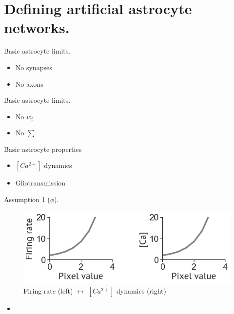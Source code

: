 \documentclass[10pt]{beamer}
\begin{document}
\section[AANs]{Defining artificial astrocyte networks.}

\begin{frame}[fragile]{Basic astrocyte limits.}
\begin{itemize}
    \item No synapses
    \item No axons 
\end{itemize}
\end{frame}

\begin{frame}[fragile]{Basic astrocyte limits.}
\begin{itemize}
    \item No $w_i$
    \item No $\sum$
\end{itemize}
\end{frame}

\begin{frame}[fragile]{Basic astrocyte properties}
\begin{itemize}
    \item $[Ca^{2+}]$ dynamics
    \item Gliotransmission
\end{itemize}
\end{frame}

\begin{frame}[fragile]{Assumption 1 ($\phi$).}
\begin{figure}
    \centering
    \includegraphics[scale=0.4]{images/phi_ca.png}
    \caption{Firing rate (left) $\leftrightarrow$ $[Ca^{2+}]$ dynamics (right)}
\end{figure}
\begin{itemize}
    \item 
\end{itemize}
\end{frame}
\end{document}
